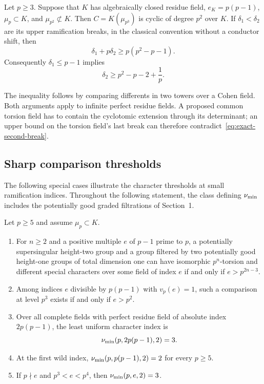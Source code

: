 \begin{theorem}\label{thm:cyclotomic-bound}
Let $p\ge3$. Suppose that $K$ has algebraically closed residue field, $e_K=p(p-1)$, $\mu_p\subset K$, and $\mu_{p^2}\not\subset K$. Then $C=K(\mu_{p^3})$ is cyclic of degree $p^2$ over $K$. If $\delta_1<\delta_2$ are its upper ramification breaks, in the classical convention without a conductor shift, then
\begin{equation}\label{eq:cyclotomic-bound}
 \delta_1+p\delta_2\ge p(p^2-p-1).
\end{equation}
Consequently $\delta_1\le p-1$ implies
\begin{equation}\label{eq:second-break}
 \delta_2\ge p^2-p-2+\frac1p.
\end{equation}
\end{theorem}

The inequality follows by comparing differents in two towers over a Cohen field. Both arguments apply to infinite perfect residue fields. A proposed common torsion field has to contain the cyclotomic extension through its determinant; an upper bound on the torsion field's last break can therefore contradict~\eqref{eq:exact-second-break}.

\subsection{Sharp comparison thresholds}
The following special cases illustrate the character thresholds at small ramification indices. Throughout the following statement, the class defining $\nu_{\min}$ includes the potentially good graded filtrations of Section~1.

\begin{theorem}\label{thm:thresholds-intro}
Let $p\ge5$ and assume $\mu_p\subset K$.
\begin{enumerate}
\item For $n\ge2$ and a positive multiple $e$ of $p-1$ prime to $p$, a potentially supersingular height-two group and a group filtered by two potentially good height-one groups of total dimension one can have isomorphic $p^n$-torsion and different special characters over some field of index $e$ if and only if $e>p^{2n-3}$.
\item Among indices $e$ divisible by $p(p-1)$ with $v_p(e)=1$, such a comparison at level $p^3$ exists if and only if $e>p^2$.
\item Over all complete fields with perfect residue field of absolute index $2p(p-1)$, the least uniform character index is
\[
                         \nu_{\min}(p,2p(p-1),2)=3.
\]
\item At the first wild index, $\nu_{\min}(p,p(p-1),2)=2$ for every $p\ge5$.
\item If $p\nmid e$ and $p^3<e<p^4$, then $\nu_{\min}(p,e,2)=3$.
\end{enumerate}
\end{theorem}

